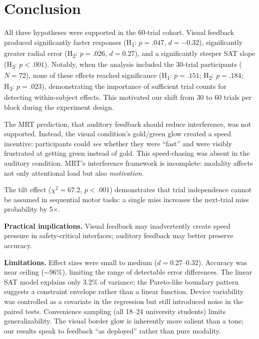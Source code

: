 \documentclass[12pt,letterpaper]{article}
\begin{document}
\section{Conclusion}

All three hypotheses were supported in the 60-trial cohort. Visual feedback produced significantly faster responses (H\textsubscript{1}: $p = .047$, $d = -0.32$), significantly greater radial error (H\textsubscript{2}: $p = .026$, $d = 0.27$), and a significantly steeper SAT slope (H\textsubscript{3}: $p < .001$). Notably, when the analysis included the 30-trial participants ($N = 72$), none of these effects reached significance (H\textsubscript{1}: $p = .151$; H\textsubscript{2}: $p = .184$; H\textsubscript{3}: $p = .023$), demonstrating the importance of sufficient trial counts for detecting within-subject effects. This motivated our shift from 30 to 60 trials per block during the experiment design.

The MRT prediction, that auditory feedback should reduce interference, was not supported. Instead, the visual condition's gold/green glow created a speed incentive: participants could \emph{see} whether they were ``fast'' and were visibly frustrated at getting green instead of gold. This speed-chasing was absent in the auditory condition. MRT's interference framework is incomplete: modality affects not only attentional load but also \emph{motivation}.

The tilt effect ($\chi^2 = 67.2$, $p < .001$) demonstrates that trial independence cannot be assumed in sequential motor tasks: a single miss increases the next-trial miss probability by 5$\times$.

\textbf{Practical implications.} Visual feedback may inadvertently create speed pressure in safety-critical interfaces; auditory feedback may better preserve accuracy.

\textbf{Limitations.} Effect sizes were small to medium ($d = 0.27$--$0.32$). Accuracy was near ceiling ($\sim$96\%), limiting the range of detectable error differences. The linear SAT model explains only 3.2\% of variance; the Pareto-like boundary pattern suggests a constraint envelope rather than a linear function. Device variability was controlled as a covariate in the regression but still introduced noise in the paired tests. Convenience sampling (all 18--24 university students) limits generalizability. The visual border glow is inherently more salient than a tone; our results speak to feedback ``as deployed'' rather than pure modality.
\end{document}
